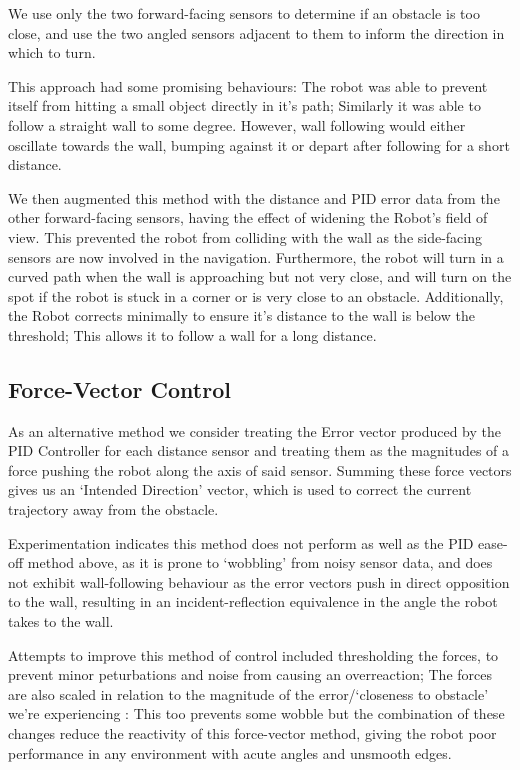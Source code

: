 \documentclass[11pt,a4wide]{article}
\begin{document}
We use only the two forward-facing sensors to determine if an obstacle is too close, 
and use the two angled sensors adjacent to them to inform the direction in which to 
turn.

This approach had some promising behaviours: The robot was able to prevent itself 
from hitting a small object directly in it's path; Similarly it was able to follow 
a straight wall to some degree. However, wall following would either oscillate 
towards the wall, bumping against it or depart after following for a short distance. 


We then augmented this method with the distance and PID error data from the other
forward-facing sensors, having the effect of widening the Robot's field of view.
This prevented the robot from colliding with the wall as the side-facing sensors 
are now involved in the navigation. Furthermore, the robot will turn in a curved path
when the wall is approaching but not very close, and will turn on the spot if the 
robot is stuck in a corner or is very close to an obstacle. Additionally, the Robot 
corrects minimally to ensure it's distance to the wall is below the threshold; This 
allows it to follow a wall for a long distance.

\subsection{Force-Vector Control}

As an alternative method we consider treating the Error vector produced by the
PID Controller for each distance sensor and treating them as the magnitudes of a 
force pushing the robot along the axis of said sensor. Summing these force vectors
gives us an `Intended Direction' vector, which is used to correct the current 
trajectory away from the obstacle.

Experimentation indicates this method does not perform as well as the PID ease-off 
method above, as it is prone to `wobbling' from noisy sensor data, and does not
exhibit wall-following behaviour as the error vectors push in direct opposition to 
the wall, resulting in an incident-reflection equivalence in the angle the robot
takes to the wall.

Attempts to improve this method of control included thresholding the forces, to 
prevent minor peturbations and noise from causing an overreaction; The forces are 
also scaled in relation to the magnitude of the error/`closeness to obstacle' we're 
experiencing : This too prevents some wobble but the combination of these changes 
reduce the reactivity of this force-vector method, giving the robot poor performance 
in any environment with acute angles and unsmooth edges.
\end{document}
